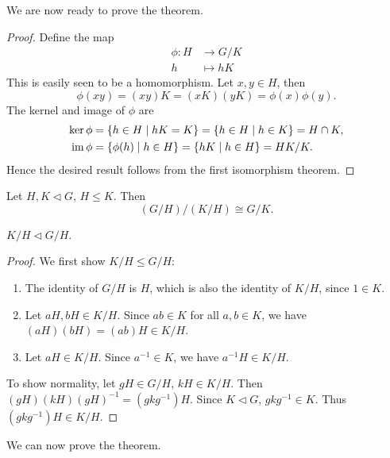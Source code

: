 We are now ready to prove the theorem.

\begin{proof}
Define the map
\begin{align*}
\phi\colon H&\to G/K\\
h&\mapsto hK
\end{align*}
This is easily seen to be a homomorphism. Let $x,y\in H$, then
\[\phi(xy)=(xy)K=(xK)(yK)=\phi(x)\phi(y).\]
The kernel and image of $\phi$ are
\begin{align*}
\ker\phi&=\{h\in H\mid hK=K\}=\{h\in H\mid h\in K\}=H\cap K,\\
\operatorname{im}\phi&=\{\phi(h)\mid h\in H\}=\{hK\mid h\in H\}=HK/K.
\end{align*}
Hence the desired result follows from the first isomorphism theorem.
\end{proof}

\begin{theorem}
Let $H,K\triangleleft G$, $H\le K$. Then
\begin{equation}
(G/H)/(K/H)\cong G/K.
\end{equation}
\end{theorem}

\begin{lemma*}
$K/H\triangleleft G/H$.
\end{lemma*}

\begin{proof}
We first show $K/H\le G/H$:
\begin{enumerate}[label=(\roman*)]
\item The identity of $G/H$ is $H$, which is also the identity of $K/H$, since $1\in K$.
\item Let $aH,bH\in K/H$. Since $ab\in K$ for all $a,b\in K$, we have $(aH)(bH)=(ab)H\in K/H$.
\item Let $aH\in K/H$. Since $a^{-1}\in K$, we have $a^{-1}H\in K/H$.
\end{enumerate}
To show normality, let $gH\in G/H$, $kH\in K/H$. Then $(gH)(kH)(gH)^{-1}=(gkg^{-1})H$. Since $K\triangleleft G$, $gkg^{-1}\in K$. Thus $(gkg^{-1})H\in K/H$.
\end{proof}

We can now prove the theorem.

